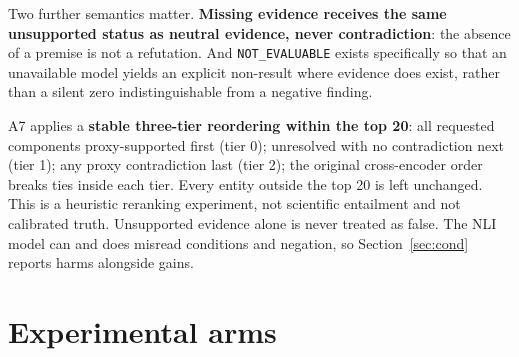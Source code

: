 \documentclass[11pt,a4paper]{article}
\begin{document}
Two further semantics matter. \textbf{Missing evidence receives the same unsupported status as neutral
evidence, never contradiction}: the absence of a premise is not a refutation. And \texttt{NOT\_EVALUABLE}
exists specifically so that an unavailable model yields an explicit non-result where evidence does exist,
rather than a silent zero indistinguishable from a negative finding.

A7 applies a \textbf{stable three-tier reordering within the top 20}: all requested components
proxy-supported first (tier 0); unresolved with no contradiction next (tier 1); any proxy contradiction last
(tier 2); the original cross-encoder order breaks ties inside each tier. Every entity outside the top 20 is
left unchanged. This is a heuristic reranking experiment, not scientific entailment and not calibrated
truth. Unsupported evidence alone is never treated as false. The NLI model can and does misread conditions
and negation, so Section~\ref{sec:cond} reports harms alongside gains.

\section{Experimental arms}
\end{document}
